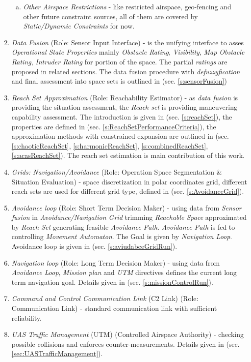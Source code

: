 \begin{enumerate}
\begin{enumerate}[a.]
            \item \emph{Other Airspace Restrictions} - like restricted airspace, geo-fencing and other future constraint sources, all of them are covered by \emph{Static/Dynamic Constraints} for now.
        \end{enumerate}
    
    \item \emph{Data Fusion} (Role: Sensor Input Interface) - is the unifying interface to asses \emph{Operational State Properties} mainly \emph{Obstacle Rating}, \emph{Visibility}, \emph{Map Obstacle Rating}, \emph{Intruder Rating} for portion of the space. The partial \emph{ratings} are proposed in related sections. The data fusion procedure with \emph{defuzzyfication} and final assessment into space sets is outlined in (sec. \ref{s:sensorFusion})  
    
    \item \emph{Reach Set Approximation} (Role: Reachability Estimator) - as \emph{data fusion} is providing the situation assessment, the \emph{Reach set} is providing maneuvering capability assessment. The introduction is given in (sec. \ref{s:reachSet}), the properties are defined in (sec. \ref{s:ReachSetPerformanceCriteria}), the approximation methods with constrained expansion are outlined in (sec. \ref{s:chaoticReachSet}, \ref{s:harmonicReachSet}, \ref{s:combinedReachSet}, \ref{s:acasReachSet}). The reach set estimation is main contribution of this work.
    
    \item \emph{Grids: Navigation/Avoidance} (Role: Operation Space Segmentation \& Situation Evaluation) - space discretization in polar coordinates grid, different reach sets are used for different grid type, defined in (sec. \ref{s:AvoidanceGrid}).
    
    \item \emph{Avoidance loop} (Role: Short Term Decision Maker) - using data from \emph{Sensor fusion} in \emph{Avoidance/Navigation Grid} trimming \emph{Reachable Space} approximated by \emph{Reach Set} generating feasible \emph{Avoidance Path}. \emph{Avoidance Path} is fed to controlling \emph{Movement Automaton}. The Goal is given by \emph{Navigation Loop}. Avoidance loop is given in (sec. \ref{s:aviudabceGridRun}).
    
    \item \emph{Navigation loop} (Role: Long Term Decision Maker) - using data from \emph{Avoidance Loop}, \emph{Mission plan} and \emph{UTM} directives defines the current long term navigation goal. Details given in (sec. \ref{s:missionControlRun}).
    
    \item \emph{Command and Control Communication Link} (C2 Link) (Role: Communication Link) - standard communication link with sufficient reliability.
    
    \item \emph{UAS Traffic Management} (UTM) (Controlled Airspace Authority) - checking possible collisions and enforces counter-measurements. Details given in (sec. \ref{sec:UASTrafficManagement}).
    
\end{enumerate}

